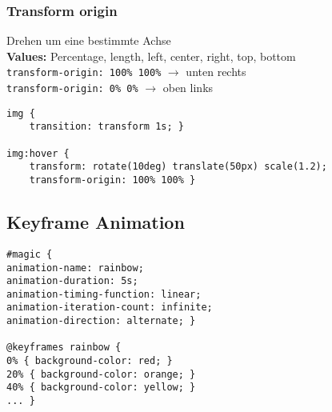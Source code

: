 \subsubsection{Transform origin}
Drehen um eine bestimmte Achse\\
\textbf{Values:} Percentage, length, left, center, right, top, bottom\\
\texttt{transform-origin: 100\% 100\%} $\rightarrow$ unten rechts\\
\texttt{transform-origin: 0\% 0\%} $\rightarrow$ oben links

\begin{lstlisting}
img {
    transition: transform 1s; }

img:hover {
    transform: rotate(10deg) translate(50px) scale(1.2);
    transform-origin: 100% 100% }
\end{lstlisting}

\subsection{Keyframe Animation}
\begin{lstlisting}
#magic {
animation-name: rainbow;
animation-duration: 5s;
animation-timing-function: linear;
animation-iteration-count: infinite;
animation-direction: alternate; }

@keyframes rainbow {
0% { background-color: red; }
20% { background-color: orange; }
40% { background-color: yellow; }
... }
\end{lstlisting}





\vfill
